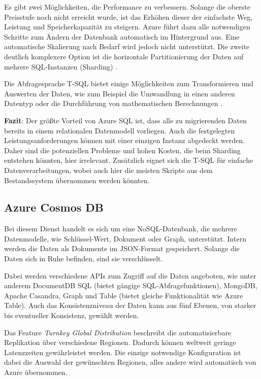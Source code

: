 Es gibt zwei Möglichkeiten, die Performance zu verbessern. Solange die oberste Preisstufe noch nicht erreicht wurde, ist das Erhöhen dieser der einfachste Weg, Leistung und Speicherkapazität zu steigern. Azure führt dazu alle notwendigen Schritte zum Ändern der Datenbank automatisch im Hintergrund aus. Eine automatische Skalierung nach Bedarf wird jedoch nicht unterstützt. Die zweite deutlich komplexere Option ist die horizontale Partitionierung der Daten auf mehrere SQL-Instanzen (Sharding) \cite{reagan_web_2018}.

Die Abfragesprache T-SQL bietet einige Möglichkeiten zum Transformieren und Auswerten der Daten, wie zum Beispiel die Umwandlung in einen anderen Datentyp oder die Durchführung von mathematischen Berechnungen \cite[vgl.][]{kellenberger_beginning_2021}.

\textbf{Fazit}: Der größte Vorteil von Azure SQL ist, dass alle zu migrierenden Daten bereits in einem relationalen Datenmodell vorliegen. Auch die festgelegten Leistungsanforderungen können mit einer einzigen Instanz abgedeckt werden. Daher sind die potenziellen Probleme und hohen Kosten, die beim Sharding entstehen könnten, hier irrelevant. Zusätzlich eignet sich die T-SQL für einfache Datenverarbeitungen, wobei auch hier die meisten Skripte aus dem Bestandssystem übernommen werden könnten.

\subsection{Azure Cosmos DB} \label{sec:grundlagen:azure_dienste:cosmosDB}
Bei diesem Dienst handelt es sich um eine NoSQL-Datenbank, die mehrere Datenmodelle, wie Schlüssel-Wert, Dokument oder Graph, unterstützt. Intern werden die Daten als Dokumente im JSON-Format gespeichert. Solange die Daten sich in Ruhe befinden, sind sie verschlüsselt.

Dabei werden verschiedene APIs zum Zugriff auf die Daten angeboten, wie unter anderem DocumentDB SQL (bietet gängige SQL-Abfragefunktionen), MongoDB, Apache Casandra, Graph und Table (bietet gleiche Funktionalität wie Azure Table). Auch das Konsistenzniveau der Daten kann aus fünf Ebenen, von starker bis eventueller Konsistenz, gewählt werden.

Das Feature \textit{Turnkey Global Distribution} beschreibt die automatisierbare Replikation über verschiedene Regionen. Dadurch können weltweit geringe Latenzzeiten gewährleistet werden. Die einzige notwendige Konfiguration ist dabei die Auswahl der gewünschten Regionen, alles andere wird automatisch von Azure übernommen.

